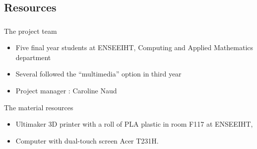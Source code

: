 \documentclass{beamer}
\begin{document}
\subsection{Resources}
\begin{frame}
	\frametitle{}
	
	\begin{block}{The project team}
		\begin{itemize}
		\item Five final year students at ENSEEIHT, Computing and Applied Mathematics department
		\item Several followed the “multimedia” option in third year
		\item Project manager : Caroline Naud
		\end{itemize}
    \end{block}
    
    \begin{block}{The material resources}
    	\begin{itemize}
    	\item Ultimaker 3D printer with a roll of PLA plastic in room F117 at ENSEEIHT,
    	\item Computer with dual-touch screen Acer T231H.
		\end{itemize}
    \end{block}
      
\end{frame}
\end{document}

